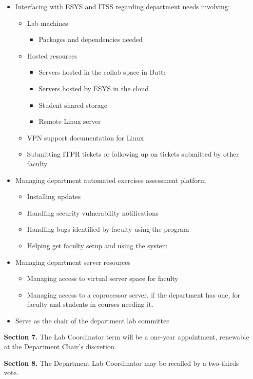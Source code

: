 \documentclass{scrartcl}
\begin{document}
\begin{itemize}
\item Interfacing with ESYS and ITSS regarding department needs involving:
\begin{itemize}
\item Lab machines
\begin{itemize}
\item Packages and dependencies needed
\end{itemize}
\item Hosted resources
\begin{itemize}
\item Servers hosted in the collab space in Butte
\item Servers hosted by ESYS in the cloud
\item Student shared storage
\item Remote Linux server
\end{itemize}
\item VPN support documentation for Linux
\item Submitting ITPR tickets or following up on tickets submitted by other faculty
\end{itemize}
\item Managing department automated exercises assessment platform
\begin{itemize}
\item Installing updates
\item Handling security vulnerability notifications
\item Handling bugs identified by faculty using the program
\item Helping get faculty setup and using the system
\end{itemize}
\item Managing department server resources
\begin{itemize}
\item Managing access to virtual server space for faculty
\item Managing access to a coprocessor server, if the department has one, for faculty and students in courses needing it.
\end{itemize}
\item Serve as the chair of the department lab committee
\end{itemize}

\textbf{Section 7.} The Lab Coordinator term will be a one-year appointment, renewable at the Department Chair’s discretion.

\textbf{Section 8.} The Department Lab Coordinator may be recalled by a two-thirds vote.
\end{document}
